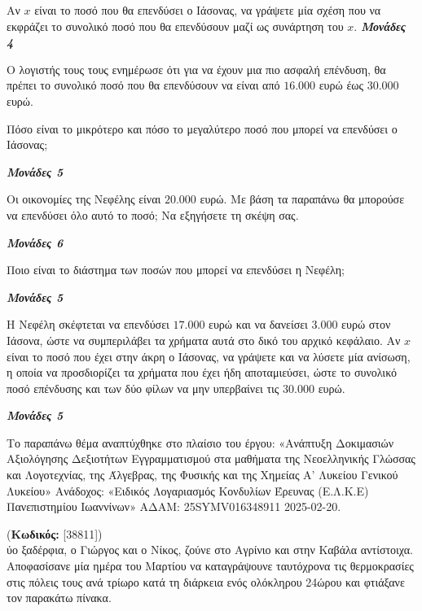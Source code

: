 \documentclass[11pt,a4paper,twoside]{book}
\newcounter{askhsh}[chapter]
\renewcommand{\theaskhsh}{
	\bf{\titlefont{\Large{\thechapter}}.\arabic{askhsh}}
}
\newcommand{\Askhsh}[2]{\refstepcounter{askhsh}{\titlefont{Άσκηση\theaskhsh} - \textcolor{maincolor}{ΘΕΜΑ #2}} (\small{\textbf{Κωδικός:} #1})\\}{}
\newcommand{\monades}[1]{
\hspace*{\fill}
\textbf{\textit{\textcolor{maincolor}{Μονάδες #1}}}}
\begin{document}
\begin{alist}
\item Αν $x$ είναι το ποσό που θα επενδύσει ο Ιάσονας, να γράψετε μία σχέση που να εκφράζει το συνολικό ποσό που θα επενδύσουν μαζί ως συνάρτηση του $x$.\monades{4}
\item Ο λογιστής τους τους ενημέρωσε ότι για να έχουν μια πιο ασφαλή επένδυση, θα πρέπει το συνολικό ποσό που θα επενδύσουν να είναι από $16.000$ ευρώ έως $30.000$ ευρώ.

\begin{rlist}
\item Πόσο είναι το μικρότερο και πόσο το μεγαλύτερο ποσό που μπορεί να επενδύσει ο Ιάσονας;
\monades{5}
\item Οι οικονομίες της Νεφέλης είναι $20.000$ ευρώ. Με βάση τα παραπάνω θα μπορούσε να επενδύσει όλο αυτό το ποσό; Να εξηγήσετε τη σκέψη σας.
\monades{6}
\item Ποιο είναι το διάστημα των ποσών που μπορεί να επενδύσει η Νεφέλη;
\monades{5}
\end{rlist}
\item Η Νεφέλη σκέφτεται να επενδύσει $17.000$ ευρώ και να δανείσει $3.000$ ευρώ στον Ιάσονα, ώστε να συμπεριλάβει τα χρήματα αυτά στο δικό του αρχικό κεφάλαιο. Αν $x$ είναι το ποσό που έχει στην άκρη ο Ιάσονας, να γράψετε και να λύσετε μία ανίσωση, η οποία να προσδιορίζει τα χρήματα που έχει ήδη αποταμιεύσει, ώστε το συνολικό ποσό επένδυσης και των δύο φίλων να μην υπερβαίνει τις $30.000$ ευρώ.
\monades{5}

{\footnotesize Το παραπάνω θέμα αναπτύχθηκε στο πλαίσιο του έργου: «Ανάπτυξη Δοκιμασιών Αξιολόγησης Δεξιοτήτων Εγγραμματισμού στα μαθήματα της Νεοελληνικής Γλώσσας και Λογοτεχνίας, της Άλγεβρας, της Φυσικής και της Χημείας Α' Λυκείου Γενικού Λυκείου» Ανάδοχος: «Ειδικός Λογαριασμός Κονδυλίων Έρευνας (Ε.Λ.Κ.Ε) Πανεπιστημίου Ιωαννίνων» ΑΔΑΜ: 25SYMV016348911 2025-02-20.}
\end{alist}

\vspace{4mm}

\Askhsh{[38811]}
Δύο ξαδέρφια, ο Γιώργος και ο Νίκος, ζούνε στο Αγρίνιο και στην Καβάλα αντίστοιχα. Αποφασίσανε μία ημέρα του Μαρτίου να καταγράψουνε ταυτόχρονα τις θερμοκρασίες στις πόλεις τους ανά τρίωρο κατά τη διάρκεια ενός ολόκληρου 24ώρου και φτιάξανε τον παρακάτω πίνακα.
\end{document}
